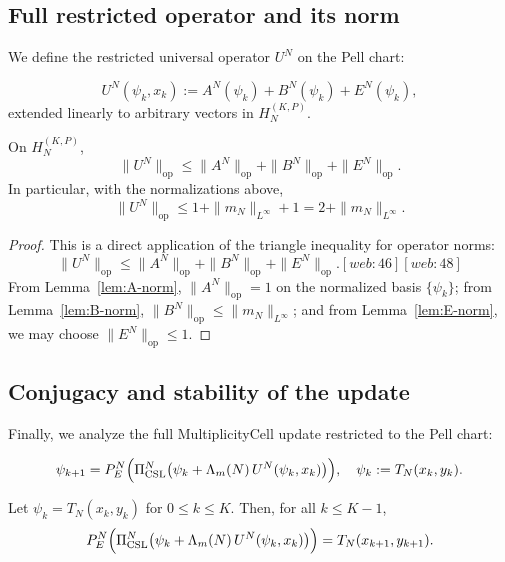 \documentclass[11pt]{article}
\begin{document}
\subsection{Full restricted operator and its norm}
\label{app:U-norm}

We define the restricted universal operator \(U^N\) on the Pell chart:

\begin{definition}
\[
U^N(\psi_k,x_k) := A^N(\psi_k) + B^N(\psi_k) + E^N(\psi_k),
\]
extended linearly to arbitrary vectors in \(H_N^{(K,P)}\).
\]
\end{definition}

\begin{lemma}
\label{lem:U-norm}
On \(H_N^{(K,P)}\),
\[
\|U^N\|_{\text{op}} \le \|A^N\|_{\text{op}} + \|B^N\|_{\text{op}} +
\|E^N\|_{\text{op}}.
\]
In particular, with the normalizations above,
\[
\|U^N\|_{\text{op}} \le 1 + \|m_N\|_{L^\infty} + 1
= 2 + \|m_N\|_{L^\infty}.
\]
\end{lemma}

\begin{proof}
This is a direct application of the triangle inequality for operator
norms:
\[
\|U^N\|_{\text{op}}
\le \|A^N\|_{\text{op}} + \|B^N\|_{\text{op}} + \|E^N\|_{\text{op}}.[web:46][web:48]
\]
From Lemma~\ref{lem:A-norm}, \(\|A^N\|_{\text{op}} = 1\) on the normalized
basis \(\{\psi_k\}\); from Lemma~\ref{lem:B-norm}, \(\|B^N\|_{\text{op}}
\le \|m_N\|_{L^\infty}\); and from Lemma~\ref{lem:E-norm}, we may choose
\(\|E^N\|_{\text{op}}\le 1\).
\end{proof}

\subsection{Conjugacy and stability of the update}

Finally, we analyze the full MultiplicityCell update restricted to the
Pell chart:

\[
\psi_{k+1} =
P_E^N\Bigl(\Pi_{\rm CSL}^N\bigl(\psi_k + \Lambda_m(N)\,
U^N(\psi_k, x_k)\bigr)\Bigr),\quad
\psi_k := T_N(x_k,y_k).
\]

\begin{lemma}
\label{lem:commutativity}
Let \(\psi_k = T_N(x_k,y_k)\) for \(0\le k\le K\). Then, for all
\(k \le K-1\),
\[
P_E^N\Bigl(\Pi_{\rm CSL}^N\bigl(\psi_k + \Lambda_m(N)\,
U^N(\psi_k, x_k)\bigr)\Bigr)
= T_N(x_{k+1},y_{k+1}).
\]
\end{lemma}
\end{document}
